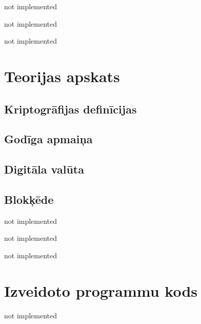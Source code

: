 \documentclass[singlespacing, latexmargins]{ludis}
\begin{document}
\maketitle

\begin{abstract-lv}
    not implemented

\end{abstract-lv}

\begin{abstract-en}
    not implemented

\end{abstract-en}

\tableofcontents

not implemented



\chapter{Teorijas apskats}


\section{Kriptogrāfijas definīcijas}

\section{Godīga apmaiņa}

\section{Digitāla valūta}

\section{Blokķēde}

not implemented

not implemented

not implemented


\appendix
\chapter{Izveidoto programmu kods}
not implemented
\end{document}
